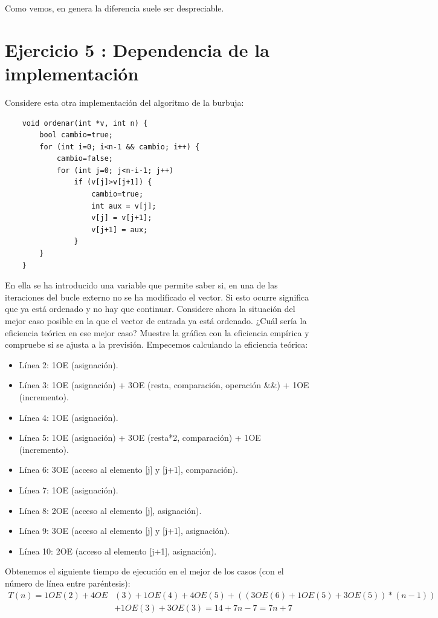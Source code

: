 \documentclass{article}
\begin{document}
	Como vemos, en genera la diferencia suele ser despreciable.


\clearpage
\section{Ejercicio 5 : Dependencia de la implementación}
Considere esta otra implementación del algoritmo de la burbuja:
\begin{lstlisting}
	void ordenar(int *v, int n) {
		bool cambio=true;
		for (int i=0; i<n-1 && cambio; i++) {
			cambio=false;
			for (int j=0; j<n-i-1; j++)
				if (v[j]>v[j+1]) {
					cambio=true;
					int aux = v[j];
					v[j] = v[j+1];
					v[j+1] = aux;
				}
		}
	}
\end{lstlisting}

En ella se ha introducido una variable que permite saber si, en una de las iteraciones del
bucle externo no se ha modificado el vector. Si esto ocurre significa que ya está ordenado
y no hay que continuar.
Considere ahora la situación del mejor caso posible en la que el vector de entrada ya está
ordenado. ¿Cuál sería la eficiencia teórica en ese mejor caso? Muestre la gráfica con la
eficiencia empírica y compruebe si se ajusta a la previsión.
\clearpage
Empecemos calculando la eficiencia teórica:
\begin{itemize}
	\item Línea 2: 1OE (asignación).
	\item Línea 3: 1OE (asignación) + 3OE (resta, comparación,
          operación \&\&) + 1OE (incremento).
	\item Línea 4: 1OE (asignación).
	\item Línea 5: 1OE (asignación) + 3OE (resta*2, comparación) + 1OE (incremento).
	\item Línea 6: 3OE (acceso al elemento [j] y [j+1], comparación).
	\item Línea 7: 1OE (asignación).
	\item Línea 8: 2OE (acceso al elemento [j], asignación).
	\item Línea 9: 3OE (acceso al elemento [j] y [j+1], asignación).
	\item Línea 10: 2OE (acceso al elemento [j+1], asignación).
\end{itemize}
Obtenemos el siguiente tiempo de ejecución en el mejor de los casos
(con el número de línea entre paréntesis):
\begin{align*}
  T(n)= 1OE(2) + 4OE&(3) + 1OE(4) + 4OE(5) + (( 3OE(6) + 1OE(5) +
  3OE(5) )*(n-1))\\& + 1OE(3) + 3OE(3) = 14+7n-7 = 7n+7
\end{align*}
\end{document}
